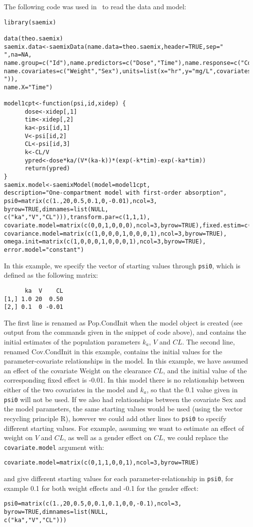 The following code was used in \R~to read the data and model:
\begin{verbatim}
library(saemix)

data(theo.saemix)
saemix.data<-saemixData(name.data=theo.saemix,header=TRUE,sep=" ",na=NA, 
name.group=c("Id"),name.predictors=c("Dose","Time"),name.response=c("Concentration"), 
name.covariates=c("Weight","Sex"),units=list(x="hr",y="mg/L",covariates=c("kg","-")), 
name.X="Time")

model1cpt<-function(psi,id,xidep) { 
	  dose<-xidep[,1]
	  tim<-xidep[,2]  
	  ka<-psi[id,1]
	  V<-psi[id,2]
	  CL<-psi[id,3]
	  k<-CL/V
	  ypred<-dose*ka/(V*(ka-k))*(exp(-k*tim)-exp(-ka*tim))
	  return(ypred)
}
saemix.model<-saemixModel(model=model1cpt,
description="One-compartment model with first-order absorption", 
psi0=matrix(c(1.,20,0.5,0.1,0,-0.01),ncol=3, byrow=TRUE,dimnames=list(NULL, 
c("ka","V","CL"))),transform.par=c(1,1,1), 
covariate.model=matrix(c(0,0,1,0,0,0),ncol=3,byrow=TRUE),fixed.estim=c(1,1,1),
covariance.model=matrix(c(1,0,0,0,1,0,0,0,1),ncol=3,byrow=TRUE), 
omega.init=matrix(c(1,0,0,0,1,0,0,0,1),ncol=3,byrow=TRUE), error.model="constant")
\end{verbatim}

In this example, we specify the vector of starting values through \texttt{psi0}, which is defined as the following matrix:
\begin{verbatim}
      ka  V    CL
[1,] 1.0 20  0.50
[2,] 0.1  0 -0.01
\end{verbatim}
The first line is renamed as Pop.CondInit when the model object is created (see output from the commands given in the snippet of code above), and contains the initial estimates of the population parameters $k_a$, $V$ and $CL$. The second line, renamed Cov.CondInit in this example, contains the initial values for the parameter-covariate relationships in the model. In this example, we have assumed an effect of the covariate Weight on the clearance $CL$, and the initial value of the corresponding fixed effect is -0.01. In this model there is no relationship between either of the two covariates in the model and $k_a$, so that the 0.1 value given in \texttt{psi0} will not be used. If we also had relationships between the covariate Sex and the model parameters, the same starting values would be used (using the vector recycling principle {\sf R}), however we could add other lines to \texttt{psi0} to specify different starting values. For example, assuming we want to estimate an effect of weight on $V$ and $CL$, as well as a gender effect on $CL$, we could replace the \texttt{covariate.model} argument with:
\begin{verbatim}
covariate.model=matrix(c(0,1,1,0,0,1),ncol=3,byrow=TRUE)
\end{verbatim}
and give different starting values for each parameter-relationship in \texttt{psi0}, for example 0.1 for both weight effects and -0.1 for the gender effect:
\begin{verbatim}
psi0=matrix(c(1.,20,0.5,0,0.1,0.1,0,0,-0.1),ncol=3, byrow=TRUE,dimnames=list(NULL, 
c("ka","V","CL")))
\end{verbatim}

